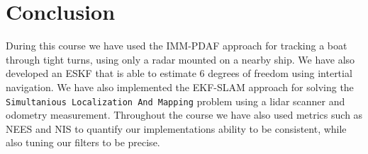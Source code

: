 \section{Conclusion}
During this course we have used the IMM-PDAF approach for tracking a boat through tight turns, using only a radar mounted on a nearby ship. We have also developed an ESKF that is able to estimate 6 degrees of freedom using intertial navigation. We have also implemented the EKF-SLAM approach for solving the \texttt{Simultanious Localization And Mapping} problem using a lidar scanner and odometry measurement. Throughout the course we have also used metrics such as NEES and NIS to quantify our implementations ability to be consistent, while also tuning our filters to be precise. 